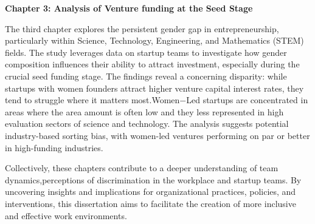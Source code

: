 \textbf{Chapter 3: Analysis of Venture funding at the Seed Stage}

The third chapter explores the persistent gender gap in entrepreneurship, particularly within Science, Technology, Engineering, and Mathematics (STEM) fields. The study leverages data on startup teams to investigate how gender composition influences their ability to attract investment, especially during the crucial seed funding stage. The findings reveal a concerning disparity: while startups with women founders attract higher venture capital interest rates, they tend to struggle where it matters most.Women$-$Led startups are concentrated in areas where the area amount is often low and they less represented in high evaluation sectors of science and technology. The analysis suggests potential industry-based sorting bias, with women-led ventures performing on par or better in high-funding industries.

Collectively, these chapters contribute to a deeper understanding of team dynamics,perceptions of discrimination in the workplace and startup teams. By uncovering insights and implications for organizational practices, policies, and interventions, this dissertation aims to facilitate the creation of more inclusive and effective work environments. 



% 